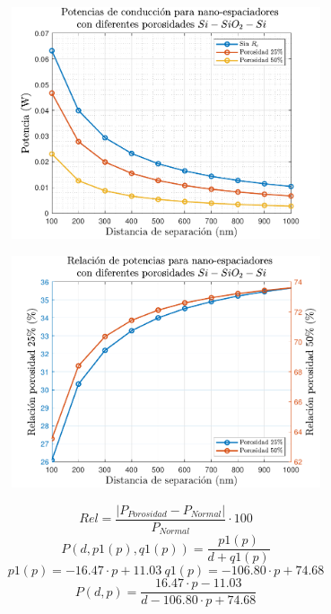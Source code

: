 \begin{figure}[H]
\begin{subfigure}[b]{0.49\textwidth}
		\caption{ }
		\label{fig:Prc2_SiSiO2Si}
	\end{subfigure}
	\begin{subfigure}[b]{0.49\textwidth}
		\centering
		\includegraphics[width=1.0\textwidth]{figuras/Resultados/conduccion/pdf/Ppor_SiSiO2Si.pdf}
		\caption{ }
		\label{fig:Ppor_SiSiO2Si}
	\end{subfigure}
	\begin{subfigure}[b]{0.49\textwidth}
		\centering
		\includegraphics[width=1.0\textwidth]{figuras/Resultados/conduccion/pdf/relPpor_SiSiO2Si.pdf}
		\caption{ }
		\label{fig:relPpor_SiSiO2Si}
	\end{subfigure}
	\caption{ }
	\label{fig:Potencias_SiSiO2Si}
\end{figure}
\[Rel=\frac{\left| P_{Porosidad}- P_{Normal} \right|}{P_{Normal}}\cdot 100\]
\[P(d,p1(p),q1(p))=\frac{p1(p)}{d+q1(p)}\]
\[p1(p)=-16.47\cdot p +11.03 \ q1(p)=-106.80\cdot p+74.68\]
\[P(d,p)=\frac{  16.47\cdot p-11.03 }{d-106.80\cdot p +74.68}\]
